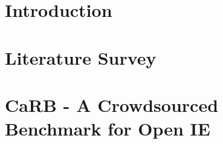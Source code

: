 \documentclass[BTech]{iitddiss}
\begin{document}


\newcommand{\shortname}{{\scshape IMoJIE}}
\newcommand{\longname}{Iterative Memory-Based Joint Open Information Extraction}
\newcommand{\boldlongname}{\textbf{I}terative \textbf{M}em\textbf{O}ry \textbf{J}oint Open \textbf{I}nformation \textbf{E}xtraction}
\newcommand{\boldshortname}{{\sc \textbf{IMoJIE}}}

\newcommand{\mlilshortname}{{\scshape MLIL}}
\newcommand{\mlillongname}{Multi-Level Iterative Labeling}
\newcommand{\mlilboldlongname}{\textbf{M}ulti \textbf{L}evel \textbf{I}terative \textbf{L}abeling}
\newcommand{\mlilboldshortname}{{\textbf{MLIL}}}


% 


\chapter{Introduction}
\label{chap:intro}



\chapter{Literature Survey}
\label{chap:literature_survey}



\chapter{CaRB - A Crowdsourced Benchmark for Open IE}
\label{chap:carb}

\end{document}
